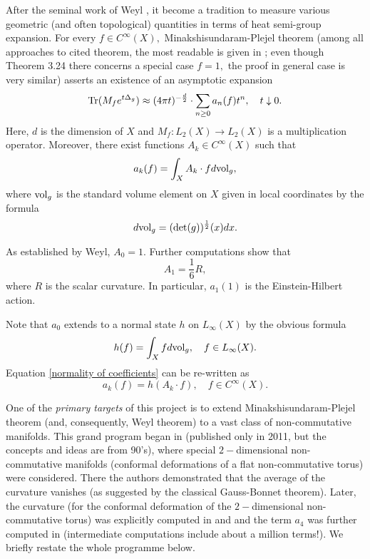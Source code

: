 \documentclass{article}
\begin{document}
After the seminal work of Weyl \cite{Weyl}, it become a tradition to measure various geometric (and often topological) quantities in terms of heat semi-group expansion. For every $f\in C^{\infty}(X),$ Minakshisundaram-Plejel theorem (among all approaches to cited theorem, the most readable is given in \cite{Rosenberg}; even though Theorem 3.24 there concerns a special case $f=1,$ the proof in general case is very similar) \cite{Rosenberg} asserts an existence of an asymptotic expansion 
\begin{equation}\label{heat asymptotic}
{\rm Tr}(M_fe^{t\Delta_g})\approx (4\pi t)^{-\frac{d}{2}}\cdot \sum_{n\geq0}a_n(f)t^n,\quad t\downarrow0.
\end{equation}
Here, $d$ is the dimension of $X$ and $M_f:L_2(X)\to L_2(X)$ is a multiplication operator. Moreover, there exist functions $A_k\in C^{\infty}(X)$ such that
\begin{equation}\label{normality of coefficients}
a_k(f)=\int_X A_k\cdot f d{\rm vol}_g,
\end{equation}
where ${\rm vol}_g$ is the standard volume element on $X$ given in local coordinates by the formula
$$d{\rm vol}_g=({\rm det}(g))^{\frac12}(x)dx.$$

As established by Weyl, $A_0=1.$ Further computations show that
$$A_1=\frac16 R,$$
where $R$ is the scalar curvature. In particular, $a_1(1)$ is the Einstein-Hilbert action.

Note that $a_0$ extends to a normal state $h$ on $L_{\infty}(X)$ by the obvious formula
$$h(f)=\int_X fd{\rm vol}_g,\quad f\in L_{\infty}(X).$$
Equation \eqref{normality of coefficients} can be re-written as
$$a_k(f)=h(A_k\cdot f),\quad f\in C^{\infty}(X).$$

One of the {\it primary targets} of this project is to extend Minakshisundaram-Plejel theorem (and, consequently, Weyl theorem) to a vast class of non-commutative manifolds. This grand program began in \cite{ConnesTretkoff} (published only in 2011, but the concepts and ideas are from 90's), where special $2-$dimensional non-commutative manifolds (conformal deformations of a flat non-commutative torus) were considered. There the authors demonstrated that the average of the curvature vanishes (as suggested by the classical Gauss-Bonnet theorem). Later, the curvature (for the conformal deformation of the $2-$dimensional non-commutative torus) was explicitly computed in \cite{ConnesMoscovici_curvature} and \cite{FathizadehKhalkhali} and the term $a_4$ was further computed in \cite{ConnesFathizadeh} (intermediate computations include about a million terms!). We briefly restate the whole programme below.  
\end{document}
